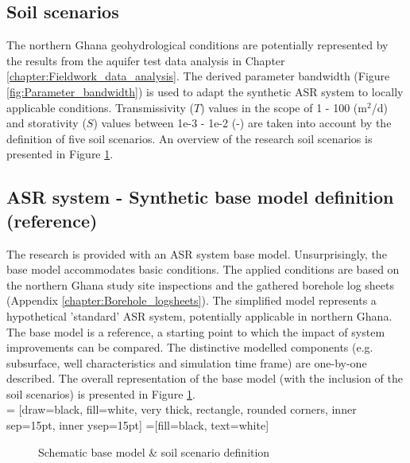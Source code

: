 \subsection{Soil scenarios}
\label{subsection:soil_sc_def}
The northern Ghana geohydrological conditions are potentially represented by the results from the aquifer test data analysis in Chapter \ref{chapter:Fieldwork_data_analysis}. The derived parameter bandwidth (Figure \ref{fig:Parameter_bandwidth}) is used to adapt the synthetic ASR system to locally applicable conditions. Transmissivity ($T$) values in the scope of 1 - 100 (m$^2$/d) and storativity ($S$) values between 1e-3 - 1e-2 (-) are taken into account by the definition of five soil scenarios. An overview of the research soil scenarios is presented in Figure \ref{fig:Schematic_base_model}.

\subsection{ASR system - Synthetic base model definition (reference)} 
\label{base_model_def}
The research is provided with an ASR system base model. Unsurprisingly, the base model accommodates basic conditions. The applied conditions are based on the northern Ghana study site inspections and the gathered borehole log sheets (Appendix \ref{chapter:Borehole_logsheets}). The simplified model represents a hypothetical 'standard' ASR system, potentially applicable in northern Ghana. The base model is a reference, a starting point to which the impact of system improvements can be compared. The distinctive modelled components (e.g. subsurface, well characteristics and simulation time frame) are one-by-one described. The overall representation of the base model (with the inclusion of the soil scenarios) is presented in Figure \ref{fig:Schematic_base_model}. \\

 = [draw=black, fill=white, very thick,
    rectangle, rounded corners, inner sep=15pt, inner ysep=15pt]
 =[fill=black, text=white]

\begin{figure}[h]
\centering
{}
\captionsetup{justification=centering}
\caption{Schematic base model \& soil scenario definition}
\label{fig:Schematic_base_model}
\end{figure}

